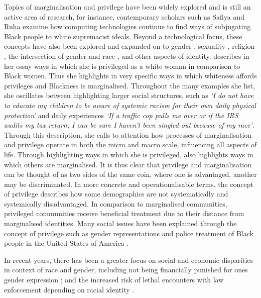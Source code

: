 Topics of marginalisation and privilege have been widely explored and is still an active area of research, for instance, contemporary scholars such as Safiya \citet{Noble:2018} and Ruha \citet{Benjamin:2019} examine how computing technologies continue to find ways of subjugating Black people to white supremacist ideals.
Beyond a technological focus, these concepts have also been explored and expanded on to gender \citep{Beauvoir:1953,Butler:1990,McIntosh:1988}, sexuality \citep{mccready_understanding_2004}, religion \citep{Beaman:2003}, the intersection of gender and race \citep{Crenshaw:1989,Voigt:2017}, and other aspects of identity.
\citet{McIntosh:1988} describes in her essay ways in which she is privileged as a white woman in comparison to Black women. Thus she highlights in very specific ways in which whiteness affords privileges and Blackness is marginalised.
Throughout the many examples she list, she oscillates between highlighting larger social structures, such as \textit{`I do not have to educate my children to be aware of systemic racism for their own daily physical protection'} and daily experiences \textit{`If a traffic cop pulls me over or if the IRS audits my tax return, I can be sure I haven't been singled out because of my race'}.
Through this description, she calls to attention how processes of marginalisation and privilege operate in both the micro and macro scale, influencing all aspects of life.
Through highlighting ways in which she is privileged, \citet{McIntosh:1988} also highlights ways in which others are marginalised.
It is thus clear that privilege and marginalisation can be thought of as two sides of the same coin, where one is advantaged, another may be discriminated.
In more concrete and operationalisable terms, the concept of privilege describes how some demographics are not systematically and systemically disadvantaged.
In comparison to marginalised communities, privileged communities receive beneficial treatment due to their distance from marginalised identities.
Many social issues have been explained through the concept of privilege such as gender representations \citep{Butler:1990} and police treatment of Black people in the United States of America \citep{Voigt:2017}.

In recent years, there has been a greater focus on social and economic disparities in context of race and gender, including not being financially punished for ones gender expression \citep{Lombardi:2002}; and the increased risk of lethal encounters with law enforcement depending on racial identity \citep{Zack:2015}.

